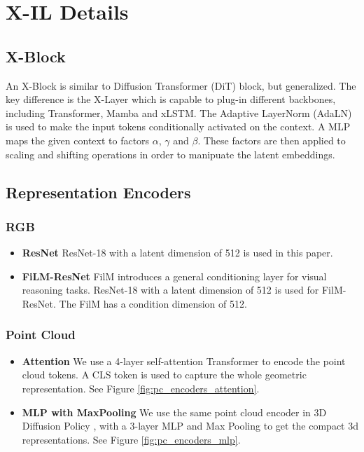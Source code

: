 \newpage
\appendix

\onecolumn

\section{X-IL Details}
\subsection{X-Block}
\label{subsec:x-block}
An X-Block is similar to Diffusion Transformer (DiT) block, but generalized. The key difference is the X-Layer which is capable to plug-in different backbones, including Transformer, Mamba and xLSTM. The Adaptive LayerNorm (AdaLN) is used to make the input tokens conditionally activated on the context. A MLP maps the given context to factors $\alpha$, $\gamma$ and $\beta$. These factors are then applied to scaling and shifting operations in order to manipuate the latent embeddings.

\subsection{Representation Encoders}
\label{subsec:repr-encoders}
\subsubsection{RGB}

\begin{itemize}
    \item \textbf{ResNet} ResNet-18 with a latent dimension of 512 is used in this paper. 
    \item \textbf{FiLM-ResNet} FilM introduces a general conditioning layer for visual reasoning tasks. ResNet-18 with a latent dimension of 512 is used for FilM-ResNet. The FilM has a condition dimension of 512.
    
\end{itemize}

\subsubsection{Point Cloud}

    \begin{itemize}
    \item \textbf{Attention} We use a 4-layer self-attention Transformer to encode the point cloud tokens. A CLS token is used to capture the whole geometric representation. See Figure \ref{fig:pc_encoders_attention}. 
    \item \textbf{MLP with MaxPooling} We use the same point cloud encoder in 3D Diffusion Policy \cite{Ze2024DP3}, with a 3-layer MLP and Max Pooling to get the compact 3d representations. See Figure \ref{fig:pc_encoders_mlp}. 
    \end{itemize}

